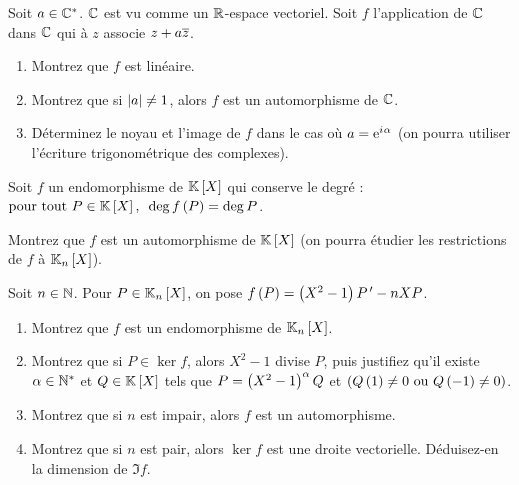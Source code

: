 \begin{exos}[Exercice 5]
Soit \(a\in\mathbb{C}^*\). \(\mathbb{C}\) est vu comme un \(\mathbb{R}\)-espace vectoriel. Soit \(f\) l'application de \(\mathbb{C}\) dans \(\mathbb{C}\) qui à \(z\) associe \(z+a\overline{z}\).

\begin{enumerate}
    \item Montrez que \(f\) est linéaire. \\
    \item Montrez que si \(\left\lvert a\right\rvert\not=1\), alors \(f\) est un automorphisme de \(\mathbb{C}\). \\
    \item Déterminez le noyau et l'image de \(f\) dans le cas où \(a=\mathrm{e}^{i\mkern1mu\alpha}\) (on pourra utiliser l'écriture trigonométrique des complexes).
\end{enumerate}
\end{exos}



\begin{exops}[Exercice 6]
Soit \(f\) un endomorphisme de \(\poly\) qui conserve le degré : \(\quantifs{\tpt P\in\poly}\deg f\paren{P}=\deg P\).

Montrez que \(f\) est un automorphisme de \(\poly\) (on pourra étudier les restrictions de \(f\) à \(\polydeg{n}\)).
\end{exops}



\begin{exopss}[Exercice 7]
Soit \(n\in\mathbb{N}\). Pour \(P\in\polydeg{n}\), on pose \(f\left(P\right)=\left(X^2-1\right)P^{\,\prime}-nXP\).

\begin{enumerate}
    \item Montrez que \(f\) est un endomorphisme de \(\polydeg{n}\). \\
    \item Montrez que si \(P\in\ker f\), alors \(X^2-1\) divise \(P\), puis justifiez qu'il existe \(\alpha\in\mathbb{N}^*\) et \(Q\in\poly\) tels que \(P=\left(X^2-1\right)^\alpha Q\) et \(\left(Q\left(1\right)\not=0\text{ ou }Q\left(-1\right)\not=0\right)\). \\
    \item Montrez que si \(n\) est impair, alors \(f\) est un automorphisme. \\
    \item Montrez que si \(n\) est pair, alors \(\ker f\) est une droite vectorielle. Déduisez-en la dimension de \(\Im f\).
\end{enumerate}
\end{exopss}



